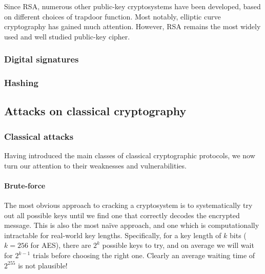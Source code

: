 Since RSA, numerous other public-key cryptosystems have been developed, based on different choices of trapdoor function. Most notably, elliptic curve cryptography has gained much attention. However, RSA remains the most widely used and well studied public-key cipher.

%
%

\subsubsection{Digital signatures} 


%
%

\subsubsection{Hashing} 


%
%

\subsection{Attacks on classical cryptography}\label{sec:attacks_on_class}

%
%

\subsubsection{Classical attacks}

Having introduced the main classes of classical cryptographic protocols, we now turn our attention to their weaknesses and vulnerabilities.

%
%

\paragraph{Brute-force}\label{sec:brute_force_attack}

The most obvious approach to cracking a cryptosystem is to systematically try out all possible keys until we find one that correctly decodes the encrypted message. This is also the most na\"ive approach, and one which is computationally intractable for real-world key lengths. Specifically, for a key length of $k$ bits (\mbox{$k=256$} for AES), there are $2^k$ possible keys to try, and on average we will wait for $2^{k-1}$ trials before choosing the right one. Clearly an average waiting time of $2^{255}$ is not plausible!

